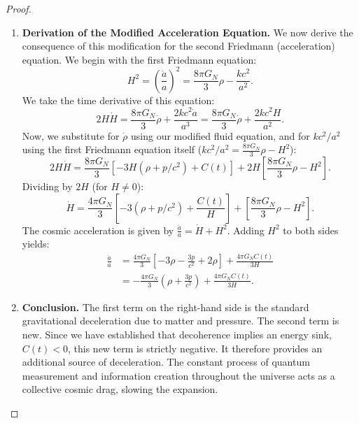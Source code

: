 \documentclass[11pt, letterpaper]{report}
\theoremstyle{plain} %
\theoremstyle{definition} %
\theoremstyle{remark} %
\begin{document}
\begin{proof}
\begin{enumerate}
    \item \textbf{Derivation of the Modified Acceleration Equation.}
    We now derive the consequence of this modification for the second Friedmann (acceleration) equation. We begin with the first Friedmann equation:
    \begin{equation}
        H^2 = \left(\frac{\dot{a}}{a}\right)^2 = \frac{8\pi G_N}{3}\rho - \frac{k c^2}{a^2}.
    \end{equation}
    We take the time derivative of this equation:
    \begin{equation}
        2H\dot{H} = \frac{8\pi G_N}{3}\dot{\rho} + \frac{2k c^2 \dot{a}}{a^3} = \frac{8\pi G_N}{3}\dot{\rho} + \frac{2k c^2 H}{a^2}.
    \end{equation}
    Now, we substitute for $\dot{\rho}$ using our modified fluid equation, and for $k c^2/a^2$ using the first Friedmann equation itself ($k c^2/a^2 = \frac{8\pi G_N}{3}\rho - H^2$):
    \begin{equation}
        2H\dot{H} = \frac{8\pi G_N}{3}\left[-3H(\rho + p/c^2) + C(t)\right] + 2H\left[\frac{8\pi G_N}{3}\rho - H^2\right].
    \end{equation}
    Dividing by $2H$ (for $H \neq 0$):
    \begin{equation}
        \dot{H} = \frac{4\pi G_N}{3}\left[-3(\rho + p/c^2) + \frac{C(t)}{H}\right] + \left[\frac{8\pi G_N}{3}\rho - H^2\right].
    \end{equation}
    The cosmic acceleration is given by $\frac{\ddot{a}}{a} = \dot{H} + H^2$. Adding $H^2$ to both sides yields:
    \begin{align}
        \frac{\ddot{a}}{a} &= \frac{4\pi G_N}{3}\left[-3\rho - \frac{3p}{c^2} + 2\rho\right] + \frac{4\pi G_N C(t)}{3H} \\
        &= -\frac{4\pi G_N}{3}\left(\rho + \frac{3p}{c^2}\right) + \frac{4\pi G_N C(t)}{3H}.
        \label{eq:modified_acceleration_equation}
    \end{align}

    \item \textbf{Conclusion.} The first term on the right-hand side is the standard gravitational deceleration due to matter and pressure. The second term is new. Since we have established that decoherence implies an energy sink, $C(t)<0$, this new term is strictly negative. It therefore provides an additional source of deceleration. The constant process of quantum measurement and information creation throughout the universe acts as a collective cosmic drag, slowing the expansion.
\end{enumerate}
\end{proof}
\end{document}
